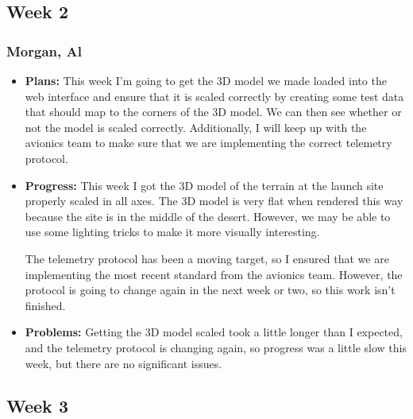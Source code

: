 \documentclass[10pt,draftclsnofoot,onecolumn]{IEEEtran}
\begin{document}
\subsection{Week 2}
\subsubsection{Morgan, Al}
\begin{itemize}
	\item \textbf{Plans: }
	This week I'm going to get the 3D model we made loaded into the web interface and ensure that it is scaled correctly by creating some test data that should map to the corners of the 3D model. We can then see whether or not the model is scaled correctly. Additionally, I will keep up with the avionics team to make sure that we are implementing the correct telemetry protocol.
	\item \textbf{Progress: }
	This week I got the 3D model of the terrain at the launch site properly scaled in all axes. The 3D model is very flat when rendered this way because the site is in the middle of the desert. However, we may be able to use some lighting tricks to make it more visually interesting.

	The telemetry protocol has been a moving target, so I ensured that we are implementing the most recent standard from the avionics team. However, the protocol is going to change again in the next week or two, so this work isn't finished.
	\item \textbf{Problems: }
	Getting the 3D model scaled took a little longer than I expected, and the telemetry protocol is changing again, so progress was a little slow this week, but there are no significant issues.
\end{itemize}

\subsection{Week 3}
\end{document}
